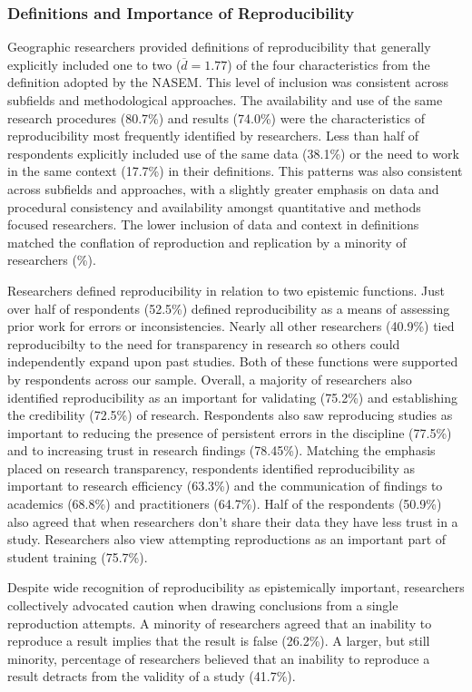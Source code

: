 \documentclass[]{interact}
\theoremstyle{plain}%
\theoremstyle{definition}
\theoremstyle{remark}
\begin{document}
\subsubsection*{Definitions and Importance of Reproducibility}
Geographic researchers provided definitions of reproducibility that generally explicitly included one to two ($\overline{d}=1.77$) of the four characteristics from the definition adopted by the NASEM.
This level of inclusion was consistent across subfields and methodological approaches.
The availability and use of the same research procedures (80.7\%) and results (74.0\%) were the characteristics of reproducibility most frequently identified by researchers. 
Less than half of respondents explicitly included use of the same data (38.1\%) or the need to work in the same context (17.7\%) in their definitions. 
This patterns was also consistent across subfields and approaches, with a slightly greater emphasis on data and procedural consistency and availability amongst quantitative and methods focused researchers.
The lower inclusion of data and context in definitions matched the conflation of reproduction and replication by a minority of researchers (\%). 

Researchers defined reproducibility in relation to two epistemic functions.
Just over half of respondents (52.5\%) defined reproducibility as a means of assessing prior work for errors or inconsistencies.
Nearly all other researchers (40.9\%) tied reproducibilty to the need for transparency in research so others could independently expand upon past studies.
Both of these functions were supported by respondents across our sample. 
Overall, a majority of researchers also identified reproducibility as an important for validating (75.2\%) and establishing the credibility (72.5\%) of research.  
Respondents also saw reproducing studies as important to reducing the presence of persistent errors in the discipline (77.5\%) and to increasing trust in research findings (78.45\%).
Matching the emphasis placed on research transparency, respondents identified reproducibility as important to research efficiency (63.3\%) and the communication of findings to academics (68.8\%) and practitioners (64.7\%). 
Half of the respondents (50.9\%) also agreed that when researchers don't share their data they have less trust in a study.
Researchers also view attempting reproductions as an important part of student training (75.7\%). 

Despite wide recognition of reproducibility as epistemically important, researchers collectively advocated caution when drawing conclusions from a single reproduction attempts. 
A minority of researchers agreed that an inability to reproduce a result implies that the result is false (26.2\%). 
A larger, but still minority, percentage of researchers believed that an inability to reproduce a result detracts from the validity of a study (41.7\%).
\end{document}
